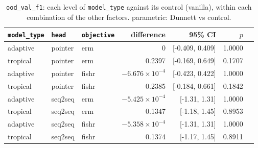 \documentclass[10pt]{article}
\begin{document}
{\small
\begin{longtable}{lllrrrl}
\caption{\texttt{ood\_val\_f1}: each level of \texttt{model\_type} against its control (vanilla), within each combination of the other factors. parametric: Dunnett vs control.}\label{tab:control-ood_val_f1}\\
\toprule
\texttt{model\_type} & \texttt{head} & \texttt{objective} & difference & 95\% CI & $p$ & \\
\midrule
\endhead
adaptive & pointer & erm & 0 & [-0.409, 0.409] & 1.0000 & \\
tropical & pointer & erm & 0.2397 & [-0.169, 0.649] & 0.1707 & \\
adaptive & pointer & fishr & $-6.676\times10^{-4}$ & [-0.423, 0.422] & 1.0000 & \\
tropical & pointer & fishr & 0.2385 & [-0.184, 0.661] & 0.1842 & \\
adaptive & seq2seq & erm & $-5.425\times10^{-4}$ & [-1.31, 1.31] & 1.0000 & \\
tropical & seq2seq & erm & 0.1347 & [-1.18, 1.45] & 0.8953 & \\
adaptive & seq2seq & fishr & $-5.358\times10^{-4}$ & [-1.31, 1.31] & 1.0000 & \\
tropical & seq2seq & fishr & 0.1374 & [-1.17, 1.45] & 0.8911 & \\
\bottomrule
\end{longtable}
}
\end{document}
